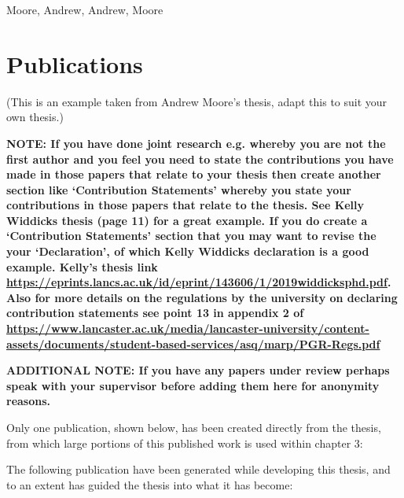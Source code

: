 \forcsvlist{\listadd\boldnames} %
  {{Moore, Andrew}, {Andrew, Moore}}

\section*{\centering Publications}
(This is an example taken from Andrew Moore's thesis, adapt this to suit your own thesis.)

\textbf{NOTE: If you have done joint research e.g. whereby you are not the first author and you feel you need to state the contributions you have made in those papers that relate to your thesis then create another section like `Contribution Statements' whereby you state your contributions in those papers that relate to the thesis. See Kelly Widdicks thesis (page 11) for a great example. If you do create a `Contribution Statements' section that you may want to revise the your `Declaration', of which Kelly Widdicks declaration is a good example. Kelly's thesis link \url{https://eprints.lancs.ac.uk/id/eprint/143606/1/2019widdicksphd.pdf}. Also for more details on the regulations by the university on declaring contribution statements see point 13 in appendix 2 of \url{https://www.lancaster.ac.uk/media/lancaster-university/content-assets/documents/student-based-services/asq/marp/PGR-Regs.pdf}}

\textbf{ADDITIONAL NOTE: If you have any papers under review perhaps speak with your supervisor before adding them here for anonymity reasons.}\vspace{1cm}

Only one publication, shown below, has been created directly from the thesis, from which large portions of this published work is used within chapter 3:\bigskip

\noindent {}\vspace{24pt}

\noindent The following publication have been generated while developing this thesis, and to an extent has guided the thesis into what it has become:\bigskip

\noindent {}\bigskip

\noindent {}\bigskip

\noindent {}\bigskip

\noindent {}

\renewcommand*{\boldnames}{} %